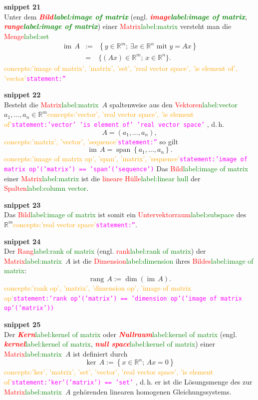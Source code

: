 \documentclass[a4paper,twoside,english,ngerman,deutsch,german,sectrefs,envcountsame,envcountchap]{svmono}
\newcommand{\setref}[2]{\textcolor{red}{#1}\textcolor{green}{#2}}
\newcommand{\snippet}[1]{\textbf{snippet #1}\\}
\newcommand{\eqnote}[2]{\textcolor{orange}{#1}\textcolor{magenta}{\texttt{#2}}}
\begin{document}
\snippet{21}
Unter dem \textbf{\em \setref{Bild}{label:image of matrix}} (engl. \textbf{\em \setref{image}{label:image of matrix}}, \textbf{\em \setref{range}{label:image of matrix}}) einer \setref{Matrix}{label:matrix} versteht man die \setref{Menge}{label:set}
\[
\begin{array}{lrl}
{\operatorname{im}}\,A & := & \left\{ y\in{\mathbb{R}}^{m};\,\exists x\in{\mathbb{R}}^{n}\textrm{ mit }y=Ax\right\} \\
 & = & \{(Ax)\in{\mathbb{R}}^{m};\,x\in{\mathbb{R}}^{n}\}.
\end{array}
\]\eqnote{concepts:'image of matrix', 'matrix', 'set', 'real vector space', 'is element of', 'vector'}{statement:''}

\snippet{22}
Besteht die \setref{Matrix}{label:matrix}~$A$ spaltenweise aus den \setref{Vektoren}{label:vector} $a_{1},\ldots,a_{n}\in{\mathbb{R}}^{m}$\eqnote{concepts:'vector', 'real vector space', 'is element of'}{statement:'vector' 'is element of' 'real vector space'} , d.\,h.
\[
A=\left(a_{1},\ldots,a_{n}\right),
\]\eqnote{concepts:'matrix', 'vector', 'sequence'}{statement:''}
so gilt
\[
{\operatorname{im}}\,A={\operatorname{span}}\left\{ a_{1},\ldots,a_{n}\right\} .
\]\eqnote{concepts:'image of matrix op', 'span', 'matrix', 'sequence'}{statement:'image of matrix op'('matrix') == 'span'('sequence')}
Das \setref{Bild}{label:image of matrix} einer \setref{Matrix}{label:matrix} ist die \setref{lineare Hülle}{label:linear hull} der \setref{Spalten}{label:column vector}.

\snippet{23}
Das \setref{Bild}{label:image of matrix} ist somit ein \setref{Untervektorraum}{label:subspace} des~${\mathbb{R}}^{m}$\eqnote{concepts:'real vector space'}{statement:''}.



\snippet{24}
Der \setref{Rang}{label:rank of matrix} (engl. \setref{rank}{label:rank of matrix}) der \setref{Matrix}{label:matrix}~$A$ ist die \setref{Dimension}{label:dimension} ihres \setref{Bildes}{label:image of matrix}:
\begin{equation}
{\operatorname{rang}}\,A:=\dim({\operatorname{im}}\,A).\label{eq:rank}
\end{equation}\eqnote{concepts:'rank op', 'matrix', 'dimension op', 'image of matrix op'}{statement:'rank op'('matrix') == 'dimension op'('image of matrix op'('matrix'))}

\snippet{25}
Der \setref{\textbf{\em Kern}}{label:kernel of matrix} oder \setref{\textbf{\em Nullraum}}{label:kernel of matrix} (engl. \setref{\textbf{\em kernel}}{label:kernel of matrix}, \setref{\textbf{\em null space}}{label:kernel of matrix}) einer \setref{Matrix}{label:matrix}~$A$ ist definiert durch
\[
\ker\,A:=\left\{ x\in{\mathbb{R}}^{n};\,Ax=0\right\}
\]\eqnote{concepts:'ker', 'matrix', 'set', 'vector', 'real vector space', 'is element of'}{statement:'ker'('matrix') == 'set'} ,
d.\,h. er ist die Lösungsmenge des zur \setref{Matrix}{label:matrix}~$A$ gehörenden linearen homogenen Gleichungssystems.
\end{document}
